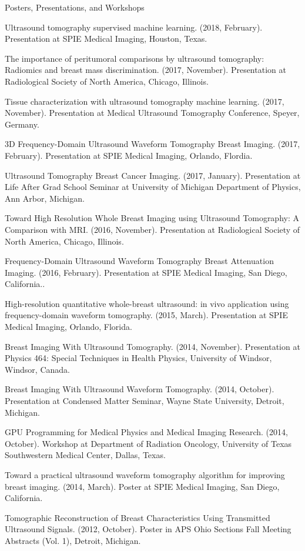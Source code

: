 \documentclass{resume} %
\begin{document}
\begin{rSection}{Posters, Presentations, and Workshops}
\item Ultrasound tomography supervised machine learning. (2018, February). Presentation at SPIE Medical Imaging, Houston, Texas.
\item The importance of peritumoral comparisons by ultrasound tomography: Radiomics and breast mass discrimination. (2017, November). Presentation at Radiological Society of North America, Chicago, Illinois.
\item Tissue characterization with ultrasound tomography machine learning. (2017, November). Presentation at Medical Ultrasound Tomography Conference, Speyer, Germany.
\item 3D Frequency-Domain Ultrasound Waveform Tomography Breast Imaging. (2017, February). Presentation at SPIE Medical Imaging, Orlando, Flordia.
\item Ultrasound Tomography Breast Cancer Imaging. (2017, January). Presentation at Life After Grad School Seminar at University of Michigan Department of Physics, Ann Arbor, Michigan.
\item Toward High Resolution Whole Breast Imaging using Ultrasound Tomography: A Comparison with MRI. (2016, November). Presentation at Radiological Society of North America, Chicago, Illinois.
\item Frequency-Domain Ultrasound Waveform Tomography Breast Attenuation Imaging. (2016, February). Presentation at SPIE Medical Imaging, San Diego, California..
\item High-resolution quantitative whole-breast ultrasound: in vivo application using frequency-domain waveform tomography. (2015, March). Presentation at SPIE Medical Imaging, Orlando, Florida.
\item Breast Imaging With Ultrasound Tomography. (2014, November). Presentation at Physics 464: Special Techniques in Health Physics, University of Windsor, Windsor, Canada.
\item Breast Imaging With Ultrasound Waveform Tomography. (2014, October). Presentation at Condensed Matter Seminar, Wayne State University, Detroit, Michigan.
\item GPU Programming for Medical Physics and Medical Imaging Research. (2014, October). Workshop at Department of Radiation Oncology, University of Texas Southwestern Medical Center, Dallas, Texas.  
\item Toward a practical ultrasound waveform tomography algorithm for improving breast imaging. (2014, March).  Poster at SPIE Medical Imaging, San Diego, California.
\item Tomographic Reconstruction of Breast Characteristics Using Transmitted Ultrasound Signals. (2012, October). Poster in APS Ohio Sections Fall Meeting Abstracts (Vol. 1), Detroit, Michigan.

\end{rSection}
\end{document}
